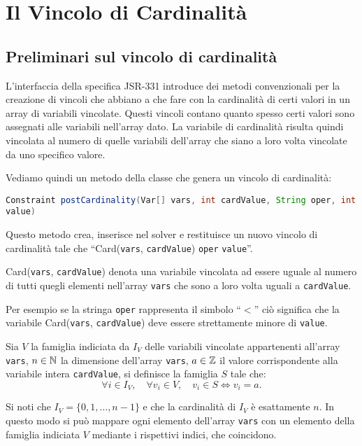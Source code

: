\chapter{Il Vincolo di Cardinalità}\label{cardinality}

\section{Preliminari sul vincolo di cardinalità}
L'interfaccia  della specifica JSR-331 introduce dei metodi
convenzionali per la creazione di vincoli che abbiano a che fare con la
cardinalità di certi valori in un
array di variabili vincolate. Questi vincoli contano
quanto spesso certi valori sono assegnati alle variabili nell'array dato.
La variabile di cardinalità risulta quindi vincolata al numero 
di quelle variabili dell'array che siano a loro volta
vincolate da uno specifico valore. 

Vediamo quindi un metodo della classe  che genera un vincolo
di cardinalità:

\begin{center}
\lstinline[language = Java]{Constraint postCardinality(Var[] vars, int cardValue, String oper, int value)}
\end{center}

Questo metodo crea, inserisce nel solver e restituisce un nuovo vincolo di
cardinalità tale che 
``Card(\texttt{vars}, \texttt{cardValue}) \texttt{oper}  \texttt{value}''.

Card(\texttt{vars}, \texttt{cardValue}) denota una variabile vincolata ad essere
uguale al numero di tutti quegli elementi nell'array \texttt{vars}  che sono
a loro volta uguali a \texttt{cardValue}.

Per esempio se la stringa \texttt{oper} rappresenta il simbolo ``$<$'' ciò 
significa che la 
variabile Card(\texttt{vars}, \texttt{cardValue}) deve essere strettamente 
minore
di \texttt{value}.

\begin{defi}\label{insCard}
Sia $V$ la famiglia indiciata da $I_V$ delle variabili vincolate 
appartenenti all'array \texttt{vars}, $n \in \mathbb{N}$ la dimensione dell'array 
\texttt{vars},
$a \in \mathbb{Z}$ il valore corrispondente alla variabile intera \texttt{cardValue}, 
si definisce la famiglia $S$ tale che:
\[ \forall i \in I_V, \quad
\forall v_i \in V, \quad
v_i \in S \Leftrightarrow v_i = a.
\] 
\end{defi}

Si noti che $I_V = \{0, 1, \ldots, n-1\}$ e che la 
cardinalità
di $I_V$ è esattamente $n$. In questo modo si può mappare ogni
elemento dell'array \texttt{vars} con un elemento della famiglia indiciata 
$V$ mediante i rispettivi indici, che coincidono.

